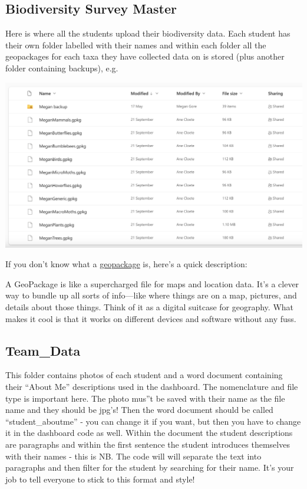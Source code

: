 \documentclass[
]{book}
\begin{document}
\hypertarget{biodiversity-survey-master}{%
\subsection{Biodiversity Survey Master}\label{biodiversity-survey-master}}

Here is where all the students upload their biodiversity data. Each student has their own folder labelled with their names and within each folder all the geopackages for each taxa they have collected data on is stored (plus another folder containing backups), e.g.~

\includegraphics{images/megan_folder.png}

If you don't know what a \href{https://www.geopackage.org/}{geopackage} is, here's a quick description:

A GeoPackage is like a supercharged file for maps and location data. It's a clever way to bundle up all sorts of info---like where things are on a map, pictures, and details about those things. Think of it as a digital suitcase for geography. What makes it cool is that it works on different devices and software without any fuss.

\hypertarget{team_data}{%
\subsection{Team\_Data}\label{team_data}}

This folder contains photos of each student and a word document containing their ``About Me'' descriptions used in the dashboard. The nomenclature and file type is important here. The photo mus''t be saved with their name as the file name and they should be jpg's! Then the word document should be called ``student\_aboutme'' - you can change it if you want, but then you have to change it in the dashboard code as well. Within the document the student descriptions are paragraphs and within the first sentence the student introduces themselves with their names - this is NB. The code will will separate the text into paragraphs and then filter for the student by searching for their name. It's your job to tell everyone to stick to this format and style!
\end{document}
